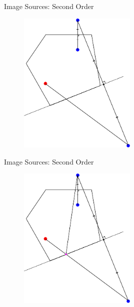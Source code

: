 \documentclass{beamer}
\begin{document}
\begin{frame}{Image Sources: Second Order}

\begin{figure}[t]
	\centering
    \includegraphics[width=0.5\textwidth]{ImageSourcesMultiDrawn1.pdf}
\end{figure}

\end{frame}

\begin{frame}{Image Sources: Second Order}

\begin{figure}[t]
	\centering
    \includegraphics[width=0.5\textwidth]{ImageSourcesMultiDrawn2.pdf}
\end{figure}

\end{frame}
\end{document}
